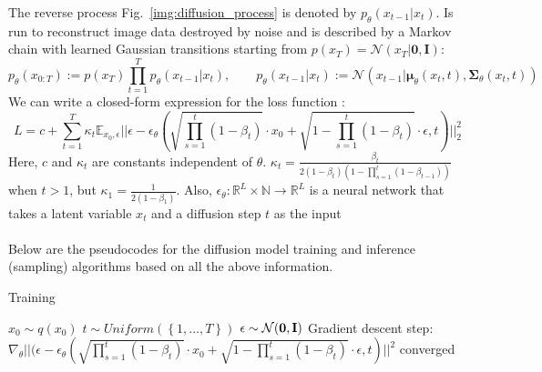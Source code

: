 \documentclass[runningheads]{llncs}
\begin{document}
The reverse process Fig.~\ref{img:diffusion_process} is denoted by $p_\theta(x_{t-1}|x_t)$. Is run to reconstruct image data destroyed by noise and is described by a Markov chain with learned Gaussian transitions starting from $p(x_T) = \mathcal{N}(x_T| \textbf{0}, \textbf{I}):$
\begin{equation}
p_\theta(x_{0:T}) := p(x_T)\prod_{t=1}^{T}p_\theta(x_{t-1}|x_t), \quad\quad p_\theta(x_{t-1}|x_t) := \mathcal{N}(x_{t-1}| \boldsymbol{\mu}_\theta(x_t, t), \boldsymbol{\Sigma}_\theta(x_t, t))
\label{eq:reverse_process}
\end{equation}
We can write a closed-form expression for the loss function \cite{Diffusion_Ho,Diffwave}:
\begin{equation}
L = c + \sum_{t=1}^T\kappa_t\mathbb{E}_{x_0,\epsilon}\Big|\Big|\epsilon - \epsilon_\theta(\sqrt{\prod_{s=1}^t(1 - \beta_t)} \cdot x_0 + \sqrt{1 - \prod_{s=1}^t(1 - \beta_t)} \cdot \epsilon, t)\Big|\Big|_2^2
\label{eq:loss_calculation_closed}
\end{equation}
Here, $c$ and $\kappa_t$ are constants independent of $\theta$. $\kappa_t = \frac{\beta_t}{2(1 - \beta_t)(1 - \prod_{s=1}^t(1 - \beta_{t-1}))}$ when $t > 1$, but $\kappa_1 = \frac{1} {2(1 - \beta_1)}$. Also, $\epsilon_\theta:\mathbb{R}^L \times \mathbb{N} \rightarrow \mathbb{R}^L$ is a neural network that takes a latent variable $x_t$ and a diffusion step $t$ as the input
\\ \\
Below are the pseudocodes for the diffusion model training and inference (sampling) algorithms based on all the above information.
\\
\begin{minipage}{0.47\textwidth}
    \begin{algorithm}[H]
        \caption{Training}
        \begin{algorithmic}
            \Repeat
                \State $x_0 \sim q(x_0)$
                \State $t \sim Uniform(\left\{1, ..., T\right\})$
                \State $\epsilon \sim \mathcal{N}(\bold{0}, \bold{I})$
                \State Gradient descent step: 
                \State \quad$\nabla_\theta\Big|\Big|(\epsilon - \epsilon_\theta(\sqrt{\prod_{s=1}^t(1 - \beta_t)} \cdot x_0 + \sqrt{1 - \prod_{s=1}^t(1 - \beta_t)} \cdot \epsilon, t)\Big|\Big|^2$
            \Until converged
        \end{algorithmic}
    \end{algorithm}
\end{minipage}
\hfill
\end{document}
